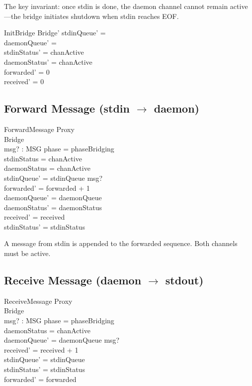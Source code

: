 \documentclass[a4paper,10pt,fleqn]{article}
\begin{document}
The key invariant: once stdin is done, the daemon channel cannot remain
active---the bridge initiates shutdown when stdin reaches EOF.

\begin{schema}{InitBridge}
  Bridge'
  \where
  stdinQueue' = \langle\rangle \\
  daemonQueue' = \langle\rangle \\
  stdinStatus' = chanActive \\
  daemonStatus' = chanActive \\
  forwarded' = 0 \\
  received' = 0
\end{schema}

\subsection{Forward Message (stdin $\to$ daemon)}

\begin{schema}{ForwardMessage}
  \Xi Proxy \\
  \Delta Bridge \\
  msg? : MSG
  \where
  phase = phaseBridging \\
  stdinStatus = chanActive \\
  daemonStatus = chanActive \\
  stdinQueue' = stdinQueue \cat \langle msg? \rangle \\
  forwarded' = forwarded + 1 \\
  daemonQueue' = daemonQueue \\
  daemonStatus' = daemonStatus \\
  received' = received \\
  stdinStatus' = stdinStatus
\end{schema}

A message from stdin is appended to the forwarded sequence.
Both channels must be active.

\subsection{Receive Message (daemon $\to$ stdout)}

\begin{schema}{ReceiveMessage}
  \Xi Proxy \\
  \Delta Bridge \\
  msg? : MSG
  \where
  phase = phaseBridging \\
  daemonStatus = chanActive \\
  daemonQueue' = daemonQueue \cat \langle msg? \rangle \\
  received' = received + 1 \\
  stdinQueue' = stdinQueue \\
  stdinStatus' = stdinStatus \\
  forwarded' = forwarded
\end{schema}
\end{document}
